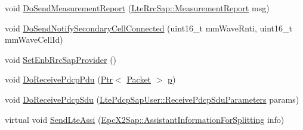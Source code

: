 \begin{DoxyCompactItemize}
\item 
void \hyperlink{classns3_1_1LteUeRrcProtocolReal_ac41ee20df1ad7487e5567e42af85a240}{Do\+Send\+Measurement\+Report} (\hyperlink{structns3_1_1LteRrcSap_1_1MeasurementReport}{Lte\+Rrc\+Sap\+::\+Measurement\+Report} msg)
\item 
void \hyperlink{classns3_1_1LteUeRrcProtocolReal_a6df09b8827c5d8e456f46b5ad8e052f0}{Do\+Send\+Notify\+Secondary\+Cell\+Connected} (uint16\+\_\+t mm\+Wave\+Rnti, uint16\+\_\+t mm\+Wave\+Cell\+Id)
\item 
void \hyperlink{classns3_1_1LteUeRrcProtocolReal_a332253a9f192cd34ed5e8840ce84e474}{Set\+Enb\+Rrc\+Sap\+Provider} ()
\item 
void \hyperlink{classns3_1_1LteUeRrcProtocolReal_a6a50583772558b240a65be7514764297}{Do\+Receive\+Pdcp\+Pdu} (\hyperlink{classns3_1_1Ptr}{Ptr}$<$ \hyperlink{classns3_1_1Packet}{Packet} $>$ \hyperlink{lte__link__budget__x2__handover__measures_8m_ac9de518908a968428863f829398a4e62}{p})
\item 
void \hyperlink{classns3_1_1LteUeRrcProtocolReal_aa9d5f54d544bc74cd6f95d6ff0ee06a9}{Do\+Receive\+Pdcp\+Sdu} (\hyperlink{structns3_1_1LtePdcpSapUser_1_1ReceivePdcpSduParameters}{Lte\+Pdcp\+Sap\+User\+::\+Receive\+Pdcp\+Sdu\+Parameters} params)
\item 
virtual void \hyperlink{classns3_1_1LteUeRrcProtocolReal_a43f27598b0ba821604695ec1e23761ad}{Send\+Lte\+Assi} (\hyperlink{structns3_1_1EpcX2Sap_1_1AssistantInformationForSplitting}{Epc\+X2\+Sap\+::\+Assistant\+Information\+For\+Splitting} info)
\end{DoxyCompactItemize}
